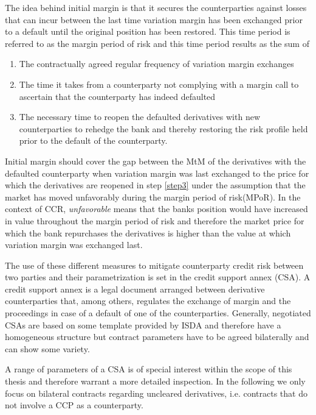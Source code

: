 \documentclass[../Thesis_AHoecherl.tex]{subfiles}
\begin{document}
The idea behind initial margin is that it secures the counterparties against losses that can incur between the last time variation margin has been exchanged prior to a default until the original position has been restored. This time period is referred to as the margin period of risk and this time period results as the sum of
\begin{enumerate}
    \item The contractually agreed regular frequency of variation margin exchanges
    \item The time it takes from a counterparty not complying with a margin call to ascertain that the counterparty has indeed defaulted
    \item The necessary time to reopen the defaulted derivatives with new counterparties to rehedge the bank and thereby restoring the risk profile held prior to the default of the counterparty.\label{step3}
\end{enumerate}
Initial margin should cover the gap between the \gls{MtM} of the derivatives with the defaulted counterparty when variation margin was last exchanged to the price for which the derivatives are reopened in step \ref{step3} under the assumption that the market has moved unfavorably during the margin period of risk(\gls{MPoR}). In the context of CCR, \emph{unfavorable} means that the banks position would have increased in value throughout the margin period of risk and therefore the market price for which the bank repurchases the derivatives is higher than the value at which variation margin was exchanged last.

The use of these different measures to mitigate counterparty credit risk between two parties and their parametrization is set in the credit support annex (\gls{CSA}). 
A credit support annex is a legal document arranged between derivative counterparties that, among others, regulates the exchange of margin and the proceedings in case of a default of one of the counterparties.
Generally, negotiated CSAs are based on some template provided by \gls{ISDA} and therefore have a homogeneous structure but contract parameters have to be agreed bilaterally and can show some variety.

A range of parameters of a \gls{CSA} is of special interest within the scope of this thesis and therefore warrant a more detailed inspection. 
In the following we only focus on bilateral contracts regarding uncleared derivatives, i.e. contracts that do not involve a \gls{CCP} as a counterparty.
\end{document}
